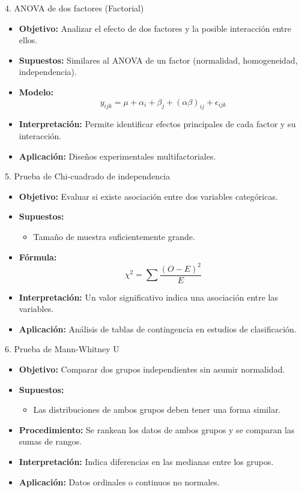 ﻿\documentclass{beamer}
\begin{document}
\begin{frame}{4. ANOVA de dos factores (Factorial)}
\begin{itemize}
    \item \textbf{Objetivo:} Analizar el efecto de dos factores y la posible interacción entre ellos.
    \item \textbf{Supuestos:} Similares al ANOVA de un factor (normalidad, homogeneidad, independencia).
    \item \textbf{Modelo:}
    \[
    y_{ijk} = \mu + \alpha_i + \beta_j + (\alpha\beta)_{ij} + \epsilon_{ijk}
    \]
    \item \textbf{Interpretación:} Permite identificar efectos principales de cada factor y su interacción.
    \item \textbf{Aplicación:} Diseños experimentales multifactoriales.
\end{itemize}
\end{frame}

\begin{frame}{5. Prueba de Chi-cuadrado de independencia}
\begin{itemize}
    \item \textbf{Objetivo:} Evaluar si existe asociación entre dos variables categóricas.
    \item \textbf{Supuestos:}
    \begin{itemize}
         \item Tamaño de muestra suficientemente grande.
    \end{itemize}
    \item \textbf{Fórmula:}
    \[
    \chi^2 = \sum \frac{(O - E)^2}{E}
    \]
    \item \textbf{Interpretación:} Un valor significativo indica una asociación entre las variables.
    \item \textbf{Aplicación:} Análisis de tablas de contingencia en estudios de clasificación.
\end{itemize}
\end{frame}

\begin{frame}{6. Prueba de Mann-Whitney U}
\begin{itemize}
    \item \textbf{Objetivo:} Comparar dos grupos independientes sin asumir normalidad.
    \item \textbf{Supuestos:}
    \begin{itemize}
         \item Las distribuciones de ambos grupos deben tener una forma similar.
    \end{itemize}
    \item \textbf{Procedimiento:} Se rankean los datos de ambos grupos y se comparan las sumas de rangos.
    \item \textbf{Interpretación:} Indica diferencias en las medianas entre los grupos.
    \item \textbf{Aplicación:} Datos ordinales o continuos no normales.
\end{itemize}
\end{frame}
\end{document}
